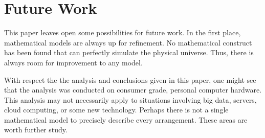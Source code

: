 \section{Future Work}
This paper leaves open some possibilities for future work. In the first place,
mathematical models are always up for refinement. No mathematical construct
has been found that can perfectly simulate the physical universe. Thus, there
is always room for improvement to any model.

With respect the the analysis and conclusions given in this paper, one might
see that the analysis was conducted on consumer grade, personal computer
hardware. This analysis may not necessarily apply to situations involving big
data, servers, cloud computing, or some new technology. Perhaps there is not a
single mathematical model to precisely describe every arrangement. These areas 
are worth further study.